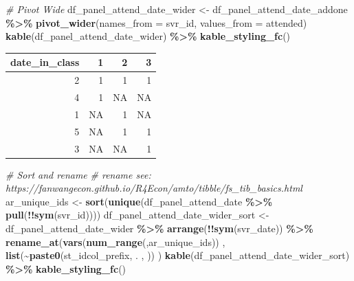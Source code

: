 \documentclass[
]{book}
\newenvironment{Shaded}{\begin{snugshade}}{\end{snugshade}}
\newcommand{\CommentTok}[1]{\textcolor[rgb]{0.56,0.35,0.01}{\textit{#1}}}
\newcommand{\DataTypeTok}[1]{\textcolor[rgb]{0.13,0.29,0.53}{#1}}
\newcommand{\KeywordTok}[1]{\textcolor[rgb]{0.13,0.29,0.53}{\textbf{#1}}}
\newcommand{\NormalTok}[1]{#1}
\newcommand{\OperatorTok}[1]{\textcolor[rgb]{0.81,0.36,0.00}{\textbf{#1}}}
\newcommand{\StringTok}[1]{\textcolor[rgb]{0.31,0.60,0.02}{#1}}
\begin{document}
\begin{Shaded}
\begin{Highlighting}[]
\CommentTok{\# Pivot Wide}
\NormalTok{df\_panel\_attend\_date\_wider \textless{}{-}}\StringTok{ }\NormalTok{df\_panel\_attend\_date\_addone }\OperatorTok{\%\textgreater{}\%}
\StringTok{  }\KeywordTok{pivot\_wider}\NormalTok{(}\DataTypeTok{names\_from =}\NormalTok{ svr\_id,}
              \DataTypeTok{values\_from =}\NormalTok{ attended)}
\KeywordTok{kable}\NormalTok{(df\_panel\_attend\_date\_wider) }\OperatorTok{\%\textgreater{}\%}
\StringTok{  }\KeywordTok{kable\_styling\_fc}\NormalTok{()}
\end{Highlighting}
\end{Shaded}

\begin{table}[!h]
\centering
\begin{tabular}{r|r|r|r}
\hline
date\_in\_class & 1 & 2 & 3\\
\hline
\rowcolor{gray!6}  2 & 1 & 1 & 1\\
\hline
4 & 1 & NA & NA\\
\hline
\rowcolor{gray!6}  1 & NA & 1 & NA\\
\hline
5 & NA & 1 & 1\\
\hline
\rowcolor{gray!6}  3 & NA & NA & 1\\
\hline
\end{tabular}
\end{table}

\begin{Shaded}
\begin{Highlighting}[]
\CommentTok{\# Sort and rename}
\CommentTok{\# rename see: https://fanwangecon.github.io/R4Econ/amto/tibble/fs\_tib\_basics.html}
\NormalTok{ar\_unique\_ids \textless{}{-}}\StringTok{ }\KeywordTok{sort}\NormalTok{(}\KeywordTok{unique}\NormalTok{(df\_panel\_attend\_date }\OperatorTok{\%\textgreater{}\%}\StringTok{ }\KeywordTok{pull}\NormalTok{(}\OperatorTok{!!}\KeywordTok{sym}\NormalTok{(svr\_id))))}
\NormalTok{df\_panel\_attend\_date\_wider\_sort \textless{}{-}}\StringTok{ }\NormalTok{df\_panel\_attend\_date\_wider }\OperatorTok{\%\textgreater{}\%}
\StringTok{    }\KeywordTok{arrange}\NormalTok{(}\OperatorTok{!!}\KeywordTok{sym}\NormalTok{(svr\_date)) }\OperatorTok{\%\textgreater{}\%}
\StringTok{    }\KeywordTok{rename\_at}\NormalTok{(}\KeywordTok{vars}\NormalTok{(}\KeywordTok{num\_range}\NormalTok{(}\StringTok{\textquotesingle{}\textquotesingle{}}\NormalTok{,ar\_unique\_ids))}
\NormalTok{              , }\KeywordTok{list}\NormalTok{(}\OperatorTok{\textasciitilde{}}\KeywordTok{paste0}\NormalTok{(st\_idcol\_prefix, . , }\StringTok{\textquotesingle{}\textquotesingle{}}\NormalTok{))}
\NormalTok{              )}
\KeywordTok{kable}\NormalTok{(df\_panel\_attend\_date\_wider\_sort) }\OperatorTok{\%\textgreater{}\%}
\StringTok{  }\KeywordTok{kable\_styling\_fc}\NormalTok{()}
\end{Highlighting}
\end{Shaded}
\end{document}
